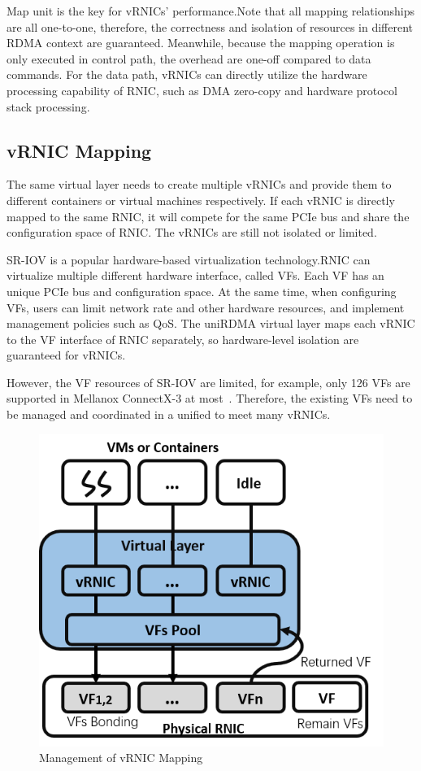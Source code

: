 Map unit is the key for vRNICs' performance.Note that all mapping relationships are all one-to-one, therefore, the correctness and isolation of resources in different RDMA context are guaranteed. Meanwhile, because the mapping operation is only executed in control path, the overhead are one-off compared to data commands. For the data path, vRNICs can directly utilize the hardware processing capability of RNIC, such as DMA zero-copy and hardware protocol stack processing.

\subsection{vRNIC Mapping}
The same virtual layer needs to create multiple vRNICs and provide them to different containers or virtual machines respectively. If each vRNIC is directly mapped to the same RNIC, it will compete for the same PCIe bus and share the configuration space of RNIC. The vRNICs are still not isolated or limited.

SR-IOV is a popular hardware-based virtualization technology.RNIC can virtualize multiple different hardware interface, called VFs. Each VF has an unique PCIe bus and configuration space. At the same time, when configuring VFs, users can limit network rate and other hardware resources, and implement management policies such as QoS. The uniRDMA virtual layer maps each vRNIC to the VF interface of RNIC separately, so hardware-level isolation are guaranteed for vRNICs.

However, the VF resources of SR-IOV are limited, for example, only 126 VFs are supported in Mellanox ConnectX-3 at most~\cite{ofed-manual}. Therefore, the existing VFs need to be managed and coordinated in a unified to meet many vRNICs.

\begin{figure}[!ht]
	\centering
	\includegraphics[width=1.0\linewidth]{images/vf-mapping}
	\caption{Management of vRNIC Mapping}
	\label{fig:vf-mapping}
\end{figure}

